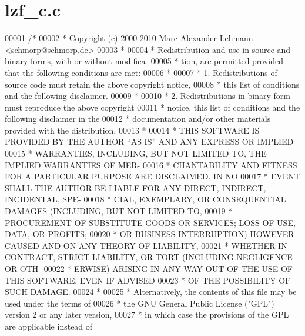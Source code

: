 \hypertarget{lzf__c_8c_source}{}\section{lzf\+\_\+c.\+c}
\label{lzf__c_8c_source}

\begin{DoxyCode}
00001 \textcolor{comment}{/*}
00002 \textcolor{comment}{ * Copyright (c) 2000-2010 Marc Alexander Lehmann <schmorp@schmorp.de>}
00003 \textcolor{comment}{ *}
00004 \textcolor{comment}{ * Redistribution and use in source and binary forms, with or without modifica-}
00005 \textcolor{comment}{ * tion, are permitted provided that the following conditions are met:}
00006 \textcolor{comment}{ *}
00007 \textcolor{comment}{ *   1.  Redistributions of source code must retain the above copyright notice,}
00008 \textcolor{comment}{ *       this list of conditions and the following disclaimer.}
00009 \textcolor{comment}{ *}
00010 \textcolor{comment}{ *   2.  Redistributions in binary form must reproduce the above copyright}
00011 \textcolor{comment}{ *       notice, this list of conditions and the following disclaimer in the}
00012 \textcolor{comment}{ *       documentation and/or other materials provided with the distribution.}
00013 \textcolor{comment}{ *}
00014 \textcolor{comment}{ * THIS SOFTWARE IS PROVIDED BY THE AUTHOR ``AS IS'' AND ANY EXPRESS OR IMPLIED}
00015 \textcolor{comment}{ * WARRANTIES, INCLUDING, BUT NOT LIMITED TO, THE IMPLIED WARRANTIES OF MER-}
00016 \textcolor{comment}{ * CHANTABILITY AND FITNESS FOR A PARTICULAR PURPOSE ARE DISCLAIMED.  IN NO}
00017 \textcolor{comment}{ * EVENT SHALL THE AUTHOR BE LIABLE FOR ANY DIRECT, INDIRECT, INCIDENTAL, SPE-}
00018 \textcolor{comment}{ * CIAL, EXEMPLARY, OR CONSEQUENTIAL DAMAGES (INCLUDING, BUT NOT LIMITED TO,}
00019 \textcolor{comment}{ * PROCUREMENT OF SUBSTITUTE GOODS OR SERVICES; LOSS OF USE, DATA, OR PROFITS;}
00020 \textcolor{comment}{ * OR BUSINESS INTERRUPTION) HOWEVER CAUSED AND ON ANY THEORY OF LIABILITY,}
00021 \textcolor{comment}{ * WHETHER IN CONTRACT, STRICT LIABILITY, OR TORT (INCLUDING NEGLIGENCE OR OTH-}
00022 \textcolor{comment}{ * ERWISE) ARISING IN ANY WAY OUT OF THE USE OF THIS SOFTWARE, EVEN IF ADVISED}
00023 \textcolor{comment}{ * OF THE POSSIBILITY OF SUCH DAMAGE.}
00024 \textcolor{comment}{ *}
00025 \textcolor{comment}{ * Alternatively, the contents of this file may be used under the terms of}
00026 \textcolor{comment}{ * the GNU General Public License ("GPL") version 2 or any later version,}
00027 \textcolor{comment}{ * in which case the provisions of the GPL are applicable instead of}

\end{DoxyCode}

